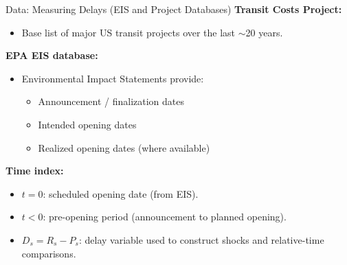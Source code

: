 \documentclass{beamer}
\begin{document}
\begin{frame}{Data: Measuring Delays (EIS and Project Databases)}
\small
\textbf{Transit Costs Project:}
\begin{itemize}
    \item Base list of major US transit projects over the last $\sim$20 years.
\end{itemize}

\medskip
\textbf{EPA EIS database:}
\begin{itemize}
    \item Environmental Impact Statements provide:
    \begin{itemize}
        \item Announcement / finalization dates
        \item Intended opening dates
        \item Realized opening dates (where available)
    \end{itemize}
\end{itemize}

\medskip
\textbf{Time index:}
\begin{itemize}
    \item $t=0$: scheduled opening date (from EIS).
    \item $t<0$: pre-opening period (announcement to planned opening).
    \item $D_s = R_s - P_s$: delay variable used to construct shocks and relative-time comparisons.
\end{itemize}
\end{frame}
\end{document}
